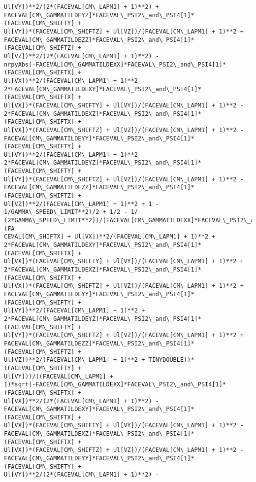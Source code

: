 \documentclass[landscape,letterpaper,10pt,english]{article}
\begin{document}
\begin{Verbatim}[commandchars=\\\{\}]
Ul[VY])**2/(2*(FACEVAL[CM\_LAPM1] + 1)**2) +
FACEVAL[CM\_GAMMATILDEYZ]*FACEVAL\_PSI2\_and\_PSI4[1]*(FACEVAL[CM\_SHIFTY] +
Ul[VY])*(FACEVAL[CM\_SHIFTZ] + Ul[VZ])/(FACEVAL[CM\_LAPM1] + 1)**2 +
FACEVAL[CM\_GAMMATILDEZZ]*FACEVAL\_PSI2\_and\_PSI4[1]*(FACEVAL[CM\_SHIFTZ] +
Ul[VZ])**2/(2*(FACEVAL[CM\_LAPM1] + 1)**2) -
nrpyAbs(-FACEVAL[CM\_GAMMATILDEXX]*FACEVAL\_PSI2\_and\_PSI4[1]*(FACEVAL[CM\_SHIFTX] +
Ul[VX])**2/(FACEVAL[CM\_LAPM1] + 1)**2 -
2*FACEVAL[CM\_GAMMATILDEXY]*FACEVAL\_PSI2\_and\_PSI4[1]*(FACEVAL[CM\_SHIFTX] +
Ul[VX])*(FACEVAL[CM\_SHIFTY] + Ul[VY])/(FACEVAL[CM\_LAPM1] + 1)**2 -
2*FACEVAL[CM\_GAMMATILDEXZ]*FACEVAL\_PSI2\_and\_PSI4[1]*(FACEVAL[CM\_SHIFTX] +
Ul[VX])*(FACEVAL[CM\_SHIFTZ] + Ul[VZ])/(FACEVAL[CM\_LAPM1] + 1)**2 -
FACEVAL[CM\_GAMMATILDEYY]*FACEVAL\_PSI2\_and\_PSI4[1]*(FACEVAL[CM\_SHIFTY] +
Ul[VY])**2/(FACEVAL[CM\_LAPM1] + 1)**2 -
2*FACEVAL[CM\_GAMMATILDEYZ]*FACEVAL\_PSI2\_and\_PSI4[1]*(FACEVAL[CM\_SHIFTY] +
Ul[VY])*(FACEVAL[CM\_SHIFTZ] + Ul[VZ])/(FACEVAL[CM\_LAPM1] + 1)**2 -
FACEVAL[CM\_GAMMATILDEZZ]*FACEVAL\_PSI2\_and\_PSI4[1]*(FACEVAL[CM\_SHIFTZ] +
Ul[VZ])**2/(FACEVAL[CM\_LAPM1] + 1)**2 + 1 - 1/GAMMA\_SPEED\_LIMIT**2)/2 + 1/2 - 1/
(2*GAMMA\_SPEED\_LIMIT**2))/(FACEVAL[CM\_GAMMATILDEXX]*FACEVAL\_PSI2\_and\_PSI4[1]*(FA
CEVAL[CM\_SHIFTX] + Ul[VX])**2/(FACEVAL[CM\_LAPM1] + 1)**2 +
2*FACEVAL[CM\_GAMMATILDEXY]*FACEVAL\_PSI2\_and\_PSI4[1]*(FACEVAL[CM\_SHIFTX] +
Ul[VX])*(FACEVAL[CM\_SHIFTY] + Ul[VY])/(FACEVAL[CM\_LAPM1] + 1)**2 +
2*FACEVAL[CM\_GAMMATILDEXZ]*FACEVAL\_PSI2\_and\_PSI4[1]*(FACEVAL[CM\_SHIFTX] +
Ul[VX])*(FACEVAL[CM\_SHIFTZ] + Ul[VZ])/(FACEVAL[CM\_LAPM1] + 1)**2 +
FACEVAL[CM\_GAMMATILDEYY]*FACEVAL\_PSI2\_and\_PSI4[1]*(FACEVAL[CM\_SHIFTY] +
Ul[VY])**2/(FACEVAL[CM\_LAPM1] + 1)**2 +
2*FACEVAL[CM\_GAMMATILDEYZ]*FACEVAL\_PSI2\_and\_PSI4[1]*(FACEVAL[CM\_SHIFTY] +
Ul[VY])*(FACEVAL[CM\_SHIFTZ] + Ul[VZ])/(FACEVAL[CM\_LAPM1] + 1)**2 +
FACEVAL[CM\_GAMMATILDEZZ]*FACEVAL\_PSI2\_and\_PSI4[1]*(FACEVAL[CM\_SHIFTZ] +
Ul[VZ])**2/(FACEVAL[CM\_LAPM1] + 1)**2 + TINYDOUBLE))*(FACEVAL[CM\_SHIFTY] +
Ul[VY]))/((FACEVAL[CM\_LAPM1] +
1)*sqrt(-FACEVAL[CM\_GAMMATILDEXX]*FACEVAL\_PSI2\_and\_PSI4[1]*(FACEVAL[CM\_SHIFTX] +
Ul[VX])**2/(2*(FACEVAL[CM\_LAPM1] + 1)**2) -
FACEVAL[CM\_GAMMATILDEXY]*FACEVAL\_PSI2\_and\_PSI4[1]*(FACEVAL[CM\_SHIFTX] +
Ul[VX])*(FACEVAL[CM\_SHIFTY] + Ul[VY])/(FACEVAL[CM\_LAPM1] + 1)**2 -
FACEVAL[CM\_GAMMATILDEXZ]*FACEVAL\_PSI2\_and\_PSI4[1]*(FACEVAL[CM\_SHIFTX] +
Ul[VX])*(FACEVAL[CM\_SHIFTZ] + Ul[VZ])/(FACEVAL[CM\_LAPM1] + 1)**2 -
FACEVAL[CM\_GAMMATILDEYY]*FACEVAL\_PSI2\_and\_PSI4[1]*(FACEVAL[CM\_SHIFTY] +
Ul[VY])**2/(2*(FACEVAL[CM\_LAPM1] + 1)**2) -

\end{Verbatim}
\end{document}
